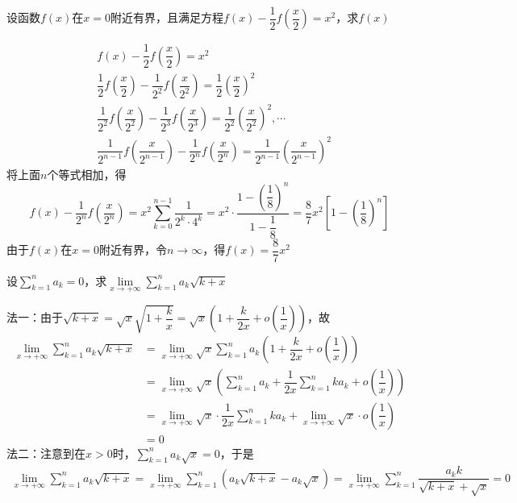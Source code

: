 \documentclass[12pt, a4paper, oneside, UTF8]{ctexbook}
\begin{document}
\begin{exercise}
    设函数$f(x)$在$x=0$附近有界，且满足方程$f(x)-\dfrac{1}{2}f(\dfrac{x}{2})=x^2$，求$f(x)$
\end{exercise}
\begin{solution}
    \begin{align*}
        &f(x)-\dfrac{1}{2}f(\dfrac{x}{2})=x^2\\
        &\dfrac{1}{2}f{\left(\dfrac{x}{2}\right)}-\dfrac{1}{2^2}f{\left(\dfrac{x}{2^2}\right)}=\dfrac{1}{2}\left(\dfrac{x}{2}\right)^2\\
        &\dfrac{1}{2^2}f{\left(\dfrac{x}{2^2}\right)}-\dfrac{1}{2^3}f{\left(\dfrac{x}{2^3}\right)}=\dfrac{1}{2^2}\left(\dfrac{x}{2^2}\right)^2 ,
        \cdots \\
        &\dfrac{1}{2^{n-1}}f{\left(\dfrac{x}{2^{n-1}}\right)}-\dfrac{1}{2^n}f{\left(\dfrac{x}{2^n}\right)}=\dfrac{1}{2^{n-1}}\left(\dfrac{x}{2^{n-1}}\right)^2
    \end{align*}
    将上面$n$个等式相加，得
    \[
    f(x)-\dfrac{1}{2^n}f{\left(\dfrac{x}{2^n}\right)}=x^2\displaystyle\sum_{k=0}^{n-1}\dfrac{1}{2^k \cdot 4^k} = x^2 \cdot \dfrac{1-\left(\dfrac{1}{8}\right)^n}{1-\dfrac{1}{8}} = \dfrac{8}{7}x^2\left[1-\left(\dfrac{1}{8}\right)^n\right]
    \]
    由于$f(x)$在$x=0$附近有界，令$n \to \infty$，得$\boxed{f(x)=\dfrac{8}{7}x^2}$
\end{solution}
\begin{exercise}
    设$\displaystyle\sum_{k=1}^{n}a_k = 0$，求$\lim\limits_{x \to +\infty} \displaystyle\sum_{k=1}^{n} a_k \sqrt{k+x}$
\end{exercise}
\begin{solution}
    法一：由于$\sqrt{k+x}=\sqrt{x}\sqrt{1+\dfrac{k}{x}}=\sqrt{x}\left(1+\dfrac{k}{2x}+o\left(\dfrac{1}{x}\right)\right)$，故
    \begin{align*}
        \lim\limits_{x \to +\infty} \displaystyle\sum_{k=1}^{n} a_k \sqrt{k+x}
        &=\lim\limits_{x \to +\infty} \sqrt{x} \displaystyle\sum_{k=1}^{n} a_k \left(1+\dfrac{k}{2x}+o\left(\dfrac{1}{x}\right)\right)\\
        &=\lim\limits_{x \to +\infty} \sqrt{x} \left(\displaystyle\sum_{k=1}^{n} a_k + \dfrac{1}{2x}\displaystyle\sum_{k=1}^{n} k a_k + o\left(\dfrac{1}{x}\right)\right)\\
        &=\lim\limits_{x \to +\infty} \sqrt{x} \cdot \dfrac{1}{2x}\displaystyle\sum_{k=1}^{n} k a_k + \lim\limits_{x \to +\infty} \sqrt{x} \cdot o\left(\dfrac{1}{x}\right)\\
        &=\boxed{0}
    \end{align*}
    法二：注意到在$x>0$时，$\displaystyle\sum_{k=1}^{n}a_k\sqrt{x} = 0$，于是
    \begin{align*}
        \lim\limits_{x \to +\infty} \displaystyle\sum_{k=1}^{n} a_k \sqrt{k+x}
        =\lim\limits_{x \to +\infty} \displaystyle\sum_{k=1}^{n} \left(a_k \sqrt{k+x}-a_k\sqrt{x}\right)
        =\lim\limits_{x \to +\infty} \displaystyle\sum_{k=1}^{n} \dfrac{a_k k}{\sqrt{k+x}+\sqrt{x}}=\boxed{0}
    \end{align*}
\end{solution}
\end{document}
